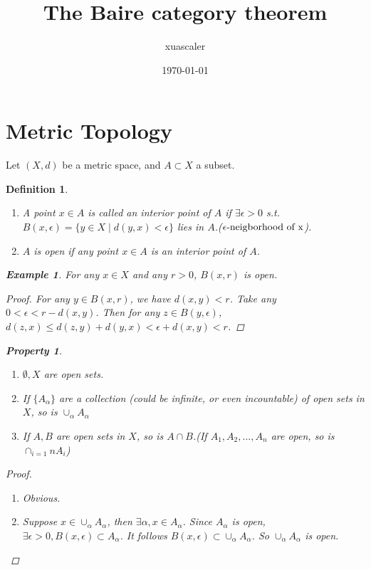 \documentclass{article}
\title{The Baire category theorem}
\author{xuascaler}
\date{\today}
\newtheorem*{property}{Property}
\newtheorem*{definition}{Definition}
\newtheorem*{example}{Example}
\begin{document}
\maketitle

\section*{Metric Topology}
Let $(X, d)$ be a metric space, and $A \subset X$ a subset.
\begin{definition}
    \begin{enumerate} \hfill
        \item A point $x \in A$ is called an interior point of $A$ if $\exists \epsilon > 0$ s.t.
        $B(x, \epsilon) = \{y \in X \mid d(y, x) < \epsilon\}$ lies in $A$.($\epsilon \textnormal{-neigborhood of x}$).
        \item $A$ is open if any point $x \in A$ is an interior point of $A$.
    \end{enumerate}
    \begin{example}
        For any $x \in X$ and any $r > 0$, $B(x, r)$ is open.
        \begin{proof}
            For any $y \in B(x, r)$, we have $d(x, y) < r$. Take any $0 < \epsilon < r - d(x, y)$.
            Then for any $z \in B(y, \epsilon)$,
            $d(z, x) \le d(z, y) + d(y, x) < \epsilon + d(x, y) < r$.
        \end{proof}
    \end{example}
    \begin{property}
        \begin{enumerate} \hfill
            \item $\emptyset, X$ are open sets.
            \item If $\{A_\alpha\}$ are a collection (could be infinite, or even incountable) of open sets in $X$,
            so is $\cup_\alpha A_\alpha$
            \item If $A, B$ are open sets in $X$, so is $A \cap B$.(If $A_1, A_2, ..., A_n$ are open, so is $\cap_{i=1}{n}A_i$)
        \end{enumerate}
        \begin{proof} \hfill
            \begin{enumerate}
                \item Obvious.
                \item Suppose $x \in \cup_\alpha A_\alpha$, then $\exists \alpha, x \in A_\alpha$. Since $A_\alpha$ is open,
                $\exists \epsilon > 0, B(x, \epsilon) \subset A_\alpha$. It follows $B(x, \epsilon) \subset \cup_\alpha A_\alpha$.
                So $\cup_\alpha A_\alpha$ is open.
            \end{enumerate}
        \end{proof}
    \end{property}
\end{definition}
\end{document}
